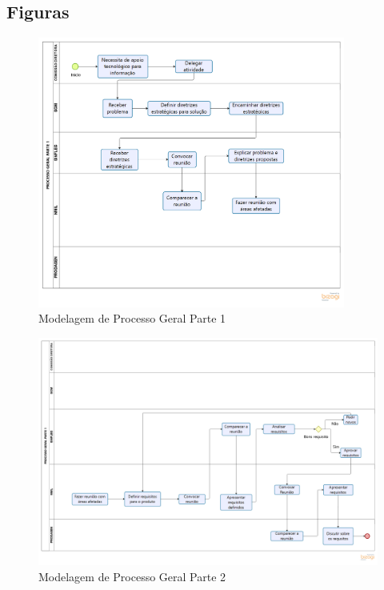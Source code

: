 \begin{apendicesenv}
    \partapendices

    \chapter{Figuras}
    \label{ch:figuras}

    \begin{figure}[H]
        \centering
        \includegraphics[width=0.9\textwidth]{figuras/modelagemProcessoGeralParte1.png}
        \caption{Modelagem de Processo Geral Parte 1}
        \label{img:modelagemProcessoGeralParte1}
    \end{figure}

    \begin{landscape}
        \begin{figure}[H]
            \centering
            \includegraphics[width=1.3\textwidth]{figuras/modelagemProcessoGeralParte2.png}
            \caption{Modelagem de Processo Geral Parte 2}
            \label{img:modelagemProcessoGeralParte2}
        \end{figure}
    \end{landscape}
    
\end{apendicesenv}